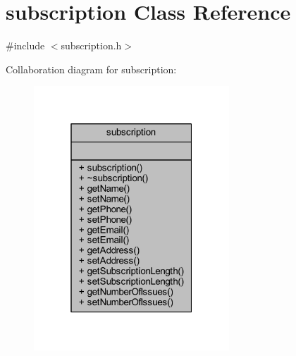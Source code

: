 \hypertarget{classsubscription}{}\section{subscription Class Reference}
\label{classsubscription}


{\ttfamily \#include $<$subscription.\+h$>$}



Collaboration diagram for subscription\+:
\nopagebreak
\begin{figure}[H]
\begin{center}
\leavevmode
\includegraphics[width=208pt]{classsubscription__coll__graph}
\end{center}
\end{figure}
